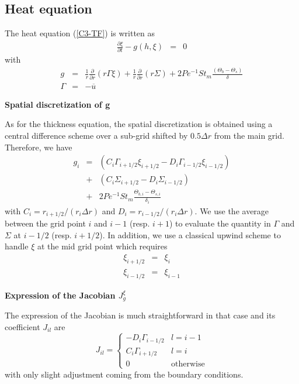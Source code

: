\subsection{Heat equation}

The heat equation (\ref{C3-TF}) is written as
\begin{eqnarray}
  \frac{\partial \xi}{\partial t}-g(h,\xi)&=&0
\end{eqnarray}
with
\begin{eqnarray}
  g& =& \frac{1}{r}\frac{\partial}{\partial                          r}
        \left( r\Gamma\xi\right) +\frac{1}{r}\frac{\partial}{\partial                          r}
        \left(r\Sigma\right)+2Pe^{-1}St_m\frac{\left(\Theta_b-\Theta_s\right)}{\delta}\\
  \Gamma&=& -\overline{u}
\end{eqnarray}

\vspace{.5cm} \textbf{Spatial discretization of g} \vspace{.5cm}

As for the thickness equation,  the spatial discretization is obtained
using  a  central  difference  scheme   over  a  sub-grid  shifted  by
$0.5\Delta r$ from the main grid. Therefore, we have
\begin{eqnarray}
  g_i &=& \left(C_i\Gamma_{i+1/2}\xi_{i+1/2}-D_i\Gamma_{i-1/2}\xi_{i-1/2}\right)\\
      &+&\left(C_i\Sigma_{i+1/2}-D_i\Sigma_{i-1/2}\right)\\
      &+&2Pe^{-1}St_m\frac{\Theta_{b,i}-\Theta_{s,i}}{\delta_i}
\end{eqnarray}
with         $C_i         =r_{i+1/2}/(r_i\Delta        r)$         and
$D_i =r_{i-1/2}/(r_i\Delta r)$.   We use the average  between the grid
point $i$ and $i-1$ (resp. $i+1$) to evaluate the quantity in $\Gamma$
and  $\Sigma$ at  $i-1/2$ (resp.   $i+1/2$).   In addition,  we use  a
classical upwind  scheme to handle $\xi$  at the mid grid  point which
requires
\begin{eqnarray}
  \xi_{i+1/2} &=& \xi_i\\
  \xi_{i-1/2} &=& \xi_{i-1}
\end{eqnarray}

\vspace{.5cm}  \textbf{Expression   of  the   Jacobian  $J_{g}^{\xi}$}
\vspace{.5cm}

The expression  of the Jacobian  is much straightforward in  that case
and its coefficient $J_{il}$ are
\begin{equation}
  J_{il}=
  \begin{cases}
    -D_i\Gamma_{i-1/2}&
    l = i-1\\
    C_i\Gamma_{i+1/2} & l = i \\
    0 & \text{otherwise}
  \end{cases}
  \label{C2-eq12}
\end{equation}
with only slight adjustment coming from the boundary conditions.

